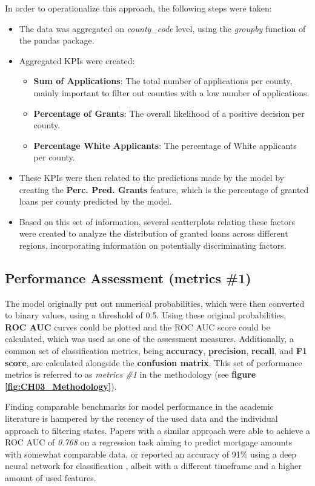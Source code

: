 In order to operationalize this approach, the following steps were taken:
\begin{itemize}
    \item The data was aggregated on \textit{county\_code} level, using the \textit{groupby} function of the pandas package.
    \item Aggregated KPIs were created: 
    \begin{itemize}
        \item \textbf{Sum of Applications}: The total number of applications per county, mainly important to filter out counties with a low number of applications.
        \item \textbf{Percentage of Grants}: The overall likelihood of a positive decision per county.
        \item \textbf{Percentage White Applicants}: The percentage of White applicants per county.
    \end{itemize}
    \item These KPIs were then related to the predictions made by the model by creating the \textbf{Perc. Pred. Grants} feature, which is the percentage of granted loans per county predicted by the model.
    \item Based on this set of information, several scatterplots relating these factors were created to analyze the distribution of granted loans across different regions, incorporating information on potentially discriminating factors. 
\end{itemize}

\subsection{Performance Assessment (metrics \#1)}\label{subsec:Performance_Assessment}

The model originally put out numerical probabilities, which were then converted to binary values, using a threshold of 0.5.
Using these original probabilities, \textbf{ROC AUC} curves could be plotted and the ROC AUC score could be calculated, which was used as one of the assessment measures.
Additionally, a common set of classification metrics, being \textbf{accuracy}, \textbf{precision}, \textbf{recall}, and \textbf{F1 score}, are calculated alongside the \textbf{confusion matrix}.
This set of performance metrics is referred to as \textit{metrics \#1} in the methodology (see \textbf{figure \ref{fig:CH03_Methodology}}).

Finding comparable benchmarks for model performance in the academic literature is hampered by the recency of the used data and the individual approach to filtering states.
Papers with a similar approach were able to achieve a ROC AUC of \textit{0.768} on a regression task aiming to predict mortgage amounts \parencite{Ghoba} with somewhat comparable data, 
or reported an accuracy of 91\% using a deep neural network for classification \parencite{Hodges2024}, albeit with a different timeframe and a higher amount of used features. 

